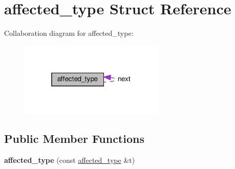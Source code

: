 \hypertarget{structaffected__type}{}\section{affected\+\_\+type Struct Reference}
\label{structaffected__type}


Collaboration diagram for affected\+\_\+type\+:
\nopagebreak
\begin{figure}[H]
\begin{center}
\leavevmode
\includegraphics[width=196pt]{structaffected__type__coll__graph}
\end{center}
\end{figure}
\subsection*{Public Member Functions}
\begin{DoxyCompactItemize}
\item 
\mbox{\label{structaffected__type_a436c00f0d935d8d1675818110b6b6614}} 
{\bfseries affected\+\_\+type} (const \hyperlink{structaffected__type}{affected\+\_\+type} \&t)
\end{DoxyCompactItemize}
